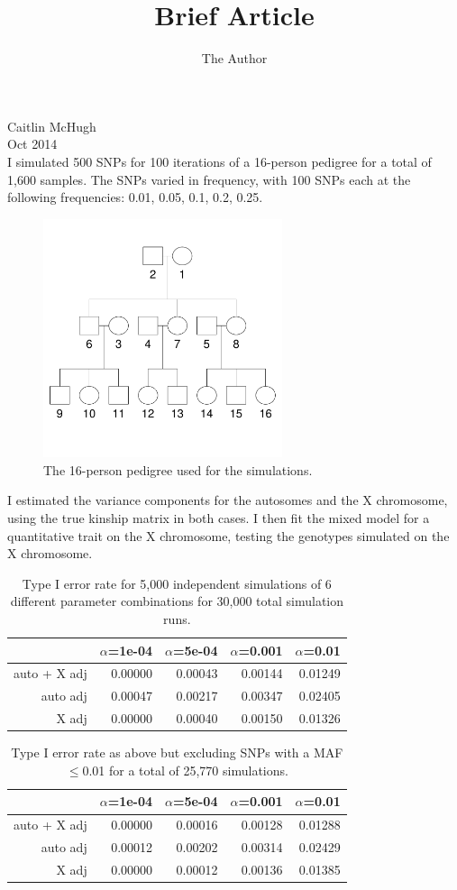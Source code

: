 \documentclass[11pt]{article} %
\title{Brief Article}
\author{The Author}
\begin{document}
\noindent Caitlin McHugh\\
Oct 2014 \\ 

\noindent I simulated 500 SNPs for 100 iterations of a 16-person pedigree for a total of 1,600 samples.
The SNPs varied in frequency, with 100 SNPs each at the following frequencies: 0.01, 0.05, 0.1, 0.2, 0.25. 


\begin{figure}[hb]
\centering
\includegraphics[height=7cm]{pedigree_16individs.pdf}
\caption{The 16-person pedigree used for the simulations.}
\end{figure}


I estimated the variance components for the autosomes and the X chromosome, using the true kinship matrix in both cases.
I then fit the mixed model for a quantitative trait on the X chromosome, testing the genotypes simulated on the X chromosome.

\begin{table}[ht]
\centering
\begin{tabular}{rrrrr}
  \hline
  &$\alpha$=1e-04& $\alpha$=5e-04 & $\alpha$=0.001 & $\alpha$=0.01 \\ 
  \hline
auto + X adj & 0.00000 & 0.00043 & 0.00144 & 0.01249 \\ 
auto adj & 0.00047 & 0.00217 & 0.00347 & 0.02405 \\ 
X adj & 0.00000 & 0.00040 & 0.00150 & 0.01326 \\ 
   \hline
\end{tabular}
\caption{Type I error rate for 5,000 independent simulations of 6 different parameter combinations for 30,000 total simulation runs.}
\end{table}

\begin{table}[ht]
\centering
\begin{tabular}{rrrrr}
  \hline
  &$\alpha$=1e-04& $\alpha$=5e-04 & $\alpha$=0.001 & $\alpha$=0.01 \\ 
  \hline
auto + X adj& 0.00000 & 0.00016 & 0.00128 & 0.01288 \\ 
auto adj & 0.00012 & 0.00202 & 0.00314 & 0.02429 \\ 
X adj & 0.00000 & 0.00012 & 0.00136 & 0.01385 \\ 
   \hline
\end{tabular}
\caption{Type I error rate as above but excluding SNPs with a MAF$\leq$0.01 for a total of 25,770 simulations.}
\end{table}
\end{document}
